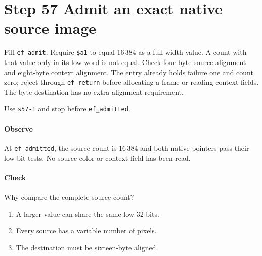 \section{Step 57 Admit an exact native source image}
Fill \texttt{ef\_admit}. Require \texttt{\$a1} to equal 16\,384 as a full-width value. A count with that value only in its low word is not equal. Check four-byte source alignment and eight-byte context alignment. The entry already holds failure one and count zero; reject through \texttt{ef\_return} before allocating a frame or reading context fields. The byte destination has no extra alignment requirement.

Use \texttt{s57-1} and stop before \texttt{ef\_admitted}.

\paragraph{Observe} At \texttt{ef\_admitted}, the source count is 16\,384 and both native pointers pass their low-bit tests. No source color or context field has been read.

\paragraph{Check} Why compare the complete source count?
\begin{enumerate}[label=\Alph*.]
  \item A larger value can share the same low 32 bits.
  \item Every source has a variable number of pixels.
  \item The destination must be sixteen-byte aligned.
\end{enumerate}
